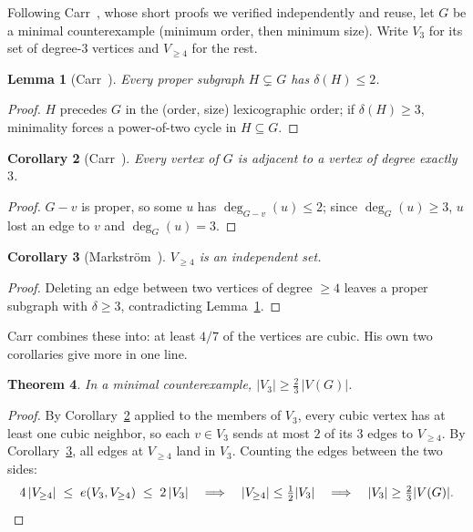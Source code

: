 \documentclass[11pt]{article}
\newtheorem{theorem}{Theorem}[section]
\newtheorem{lemma}[theorem]{Lemma}
\newtheorem{corollary}[theorem]{Corollary}
\theoremstyle{remark}
\begin{document}
Following Carr~\cite{Carr26}, whose short proofs we verified independently
and reuse, let $G$ be a minimal counterexample (minimum order, then minimum
size). Write $V_3$ for its set of degree-$3$ vertices and $V_{\ge4}$ for the
rest.

\begin{lemma}[{Carr~\cite{Carr26}}]\label{lem:proper}
Every proper subgraph $H \subsetneq G$ has $\delta(H) \le 2$.
\end{lemma}

\begin{proof}
$H$ precedes $G$ in the (order, size) lexicographic order; if
$\delta(H)\ge3$, minimality forces a power-of-two cycle in $H \subseteq G$.
\end{proof}

\begin{corollary}[{Carr~\cite{Carr26}}]\label{cor:cubicneighbor}
Every vertex of $G$ is adjacent to a vertex of degree exactly $3$.
\end{corollary}

\begin{proof}
$G - v$ is proper, so some $u$ has $\deg_{G-v}(u)\le 2$; since
$\deg_G(u)\ge3$, $u$ lost an edge to $v$ and $\deg_G(u)=3$.
\end{proof}

\begin{corollary}[{Markstr\"om~\cite{Markstrom04}}]\label{cor:indep}
$V_{\ge4}$ is an independent set.
\end{corollary}

\begin{proof}
Deleting an edge between two vertices of degree $\ge4$ leaves a proper
subgraph with $\delta\ge3$, contradicting Lemma~\ref{lem:proper}.
\end{proof}

Carr combines these into: at least $4/7$ of the vertices are cubic. His own
two corollaries give more in one line.

\begin{theorem}\label{thm:twothirds}
In a minimal counterexample, $|V_3| \ge \tfrac{2}{3}\,|V(G)|$.
\end{theorem}

\begin{proof}
By Corollary~\ref{cor:cubicneighbor} applied to the members of $V_3$, every
cubic vertex has at least one cubic neighbor, so each $v \in V_3$ sends at
most $2$ of its $3$ edges to $V_{\ge4}$. By Corollary~\ref{cor:indep}, all
edges at $V_{\ge4}$ land in $V_3$. Counting the edges between the two sides:
\[
4\,|V_{\ge4}| \;\le\; e(V_3, V_{\ge4}) \;\le\; 2\,|V_3|
\quad\Longrightarrow\quad
|V_{\ge4}| \le \tfrac{1}{2}|V_3|
\quad\Longrightarrow\quad
|V_3| \ge \tfrac{2}{3}|V(G)|. \qedhere
\]
\end{proof}
\end{document}
